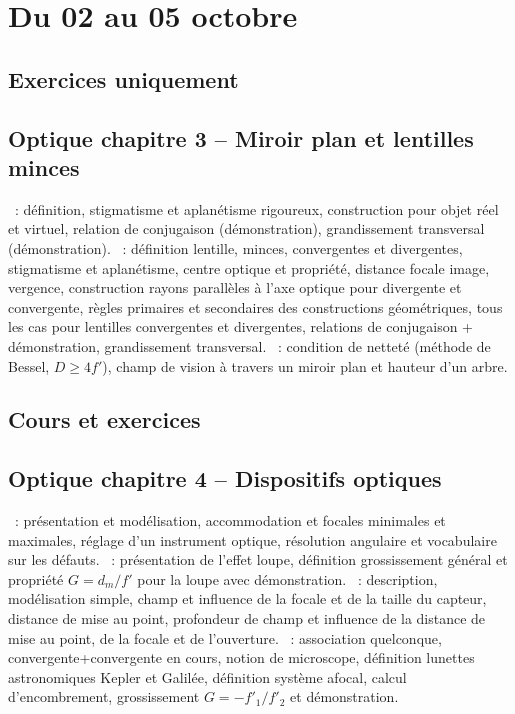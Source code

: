 \documentclass[a4paper, 12pt, final, garamond]{book}
\begin{document}
\setcounter{chapter}{2}

\chapter{Du 02 au 05 octobre}

\section{Exercices uniquement}

\section*{Optique chapitre 3 -- Miroir plan et lentilles minces}
\begin{enumerate}[label=\Roman*]
	~: définition, stigmatisme et aplanétisme
	rigoureux, construction pour objet réel et virtuel, relation de
	conjugaison (démonstration), grandissement transversal (démonstration).
	~: définition lentille, minces, convergentes
	et divergentes, stigmatisme et aplanétisme, centre optique et propriété,
	distance focale image, vergence, construction rayons parallèles à l'axe
	optique pour divergente et convergente, règles primaires et secondaires
	des constructions géométriques, tous les cas pour lentilles convergentes
	et divergentes, relations de conjugaison + démonstration, grandissement
	transversal.
	~: condition de netteté (méthode de
	Bessel, $D \geq 4f'$), champ de vision à travers un miroir plan et
	hauteur d'un arbre.
\end{enumerate}

\section{Cours et exercices}

\section*{Optique chapitre 4 -- Dispositifs optiques}
\begin{enumerate}[label=\Roman*]
	~: présentation et modélisation, accommodation et
	focales minimales et maximales, réglage d'un instrument optique,
	résolution angulaire et vocabulaire sur les défauts.
	~: présentation de l'effet loupe, définition
	grossissement général et propriété $G = d_m/f'$ pour la loupe avec
	démonstration.
	~: description, modélisation simple, champ et
	influence de la focale et de la taille du capteur, distance de mise au
	point, profondeur de champ et influence de la distance de mise au point,
	de la focale et de l'ouverture.
	~: association
	quelconque, convergente+convergente en cours, notion de microscope,
	définition lunettes astronomiques Kepler et Galilée, définition système
	afocal, calcul d'encombrement, grossissement $G=-f'_1/f'_2$ et
	démonstration.
\end{enumerate}
\end{document}
